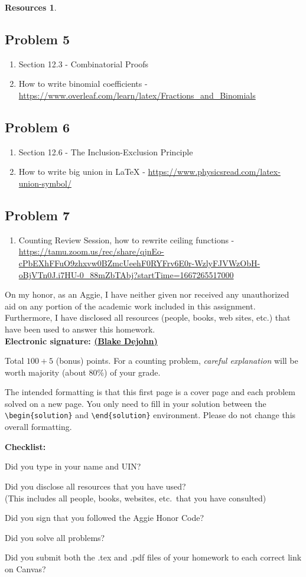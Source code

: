 \documentclass{article}
\theoremstyle{definition}
\newtheorem*{solution}{Solution}
\newtheorem*{resources}{Resources}
\newcommand{\honor}{\noindent On my honor, as an Aggie, I have neither
  given nor received any unauthorized aid on any portion of the
  academic work included in this assignment. Furthermore, I have
  disclosed all resources (people, books, web sites, etc.) that have
  been used to answer this homework. \\[2ex]
 \textbf{Electronic signature: \underline{ (Blake Dejohn) } } } %
\newcommand{\checklist}{\noindent\textbf{Checklist:}
\begin{compactitem}[$\Box$] 
\item [\checkmark] Did you type in your name and UIN? 
\item [\checkmark] Did you disclose all resources that you have used? \\
(This includes all people, books, websites, etc.\ that you have consulted)
\item [\checkmark] Did you sign that you followed the Aggie Honor Code? 
\item [\checkmark] Did you solve all problems? 
\item [\checkmark] Did you submit both the .tex and .pdf files of your homework to each correct link on Canvas? 
\end{compactitem}
}
\begin{document}
\begin{resources}
\subsection*{Problem 5}
\begin{enumerate}
\item Section 12.3 - Combinatorial Proofs
\item How to write binomial coefficients - \url{https://www.overleaf.com/learn/latex/Fractions_and_Binomials}
\end{enumerate}
\subsection*{Problem 6}
\begin{enumerate}
\item Section 12.6 - The Inclusion-Exclusion Principle
\item How to write big union in LaTeX - \url{https://www.physicsread.com/latex-union-symbol/}
\end{enumerate}
\subsection*{Problem 7}
\begin{enumerate}
\item Counting Review Session, how to rewrite ceiling functions - \url{https://tamu.zoom.us/rec/share/qjnEo-cPbEXhFFuO9zhxvw0BZmcUeehF0RYFrv6E0r-WzlyFJVWzObH-oBjVTn0J.i7HU-0_88mZbTAbj?startTime=1667265517000}
\end{enumerate}
\end{resources}
\honor

\bigskip

\noindent
Total $100+5$ (bonus) points.  
For a counting problem, \textit{careful explanation} will be worth majority (about 80\%) of your grade.

\bigskip

\noindent
The intended formatting is that this first page is a cover page and each 
problem solved on a new page. You only need to fill in your solution between 
the \verb|\begin{solution}| and \verb|\end{solution}| environment.  
Please do not change this overall formatting.

\bigskip

\vfill
\checklist
\end{document}
